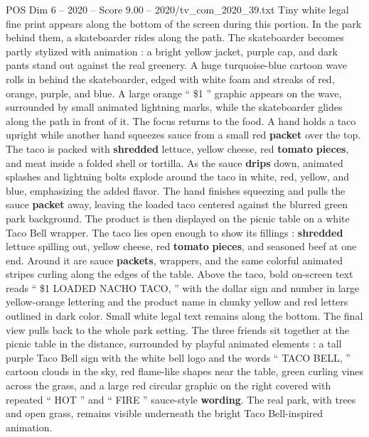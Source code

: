 \begin{textsample}{POS Dim 6 – 2020 – Score 9.00 – 2020/tv\_com\_2020\_39.txt}
Tiny white legal fine print appears along the bottom of the screen during this portion.
In the park behind them, a skateboarder rides along the path.
The skateboarder becomes partly stylized with animation : a bright yellow jacket, purple cap, and dark pants stand out against the real greenery.
A huge turquoise-blue cartoon wave rolls in behind the skateboarder, edged with white foam and streaks of red, orange, purple, and blue.
A large orange “ \$1 ” graphic appears on the wave, surrounded by small animated lightning marks, while the skateboarder glides along the path in front of it.
The focus returns to the food.
A hand holds a taco upright while another hand squeezes sauce from a small red \textbf{packet} over the top.
The taco is packed with \textbf{shredded} lettuce, yellow cheese, red \textbf{tomato} \textbf{pieces}, and meat inside a folded shell or tortilla.
As the sauce \textbf{drips} down, animated splashes and lightning bolts explode around the taco in white, red, yellow, and blue, emphasizing the added flavor.
The hand finishes squeezing and pulls the sauce \textbf{packet} away, leaving the loaded taco centered against the blurred green park background.
The product is then displayed on the picnic table on a white Taco Bell wrapper.
The taco lies open enough to show its fillings : \textbf{shredded} lettuce spilling out, yellow cheese, red \textbf{tomato} \textbf{pieces}, and seasoned beef at one end.
Around it are sauce \textbf{packets}, wrappers, and the same colorful animated stripes curling along the edges of the table.
Above the taco, bold on-screen text reads “ \$1 LOADED NACHO TACO, ” with the dollar sign and number in large yellow-orange lettering and the product name in chunky yellow and red letters outlined in dark color.
Small white legal text remains along the bottom.
The final view pulls back to the whole park setting.
The three friends sit together at the picnic table in the distance, surrounded by playful animated elements : a tall purple Taco Bell sign with the white bell logo and the words “ TACO BELL, ” cartoon clouds in the sky, red flame-like shapes near the table, green curling vines across the grass, and a large red circular graphic on the right covered with repeated “ HOT ” and “ FIRE ” sauce-style \textbf{wording}.
The real park, with trees and open grass, remains visible underneath the bright Taco Bell-inspired animation.

\end{textsample}
